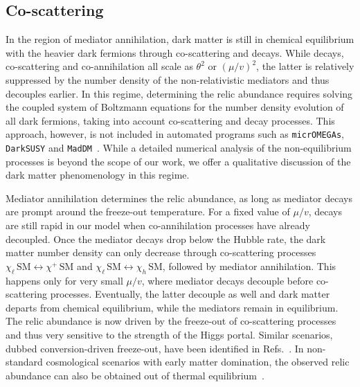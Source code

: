 \documentclass[nofootinbib,prd,aps,superscriptaddress,preprintnumbers]{revtex4}
\begin{document}
\subsection{Co-scattering}\noindent In the region of mediator annihilation, dark matter is still in chemical equilibrium with the heavier dark fermions through co-scattering and decays. While decays, co-scattering and co-annihilation all scale as $\theta^2$ or $(\mu/v)^2$, the latter is relatively suppressed by the number density of the non-relativistic mediators and thus decouples earlier. In this regime, determining the relic abundance requires solving the coupled system of Boltzmann equations for the number density evolution of all dark fermions, taking into account co-scattering and decay processes. This approach, however, is not included in automated programs such as \texttt{micrOMEGAs}, \texttt{DarkSUSY} and \texttt{MadDM}~\cite{Belanger:2018mqt,Bringmann:2018lay,Backovic}. While a detailed numerical analysis of the non-equilibrium processes is beyond the scope of our work, we offer a qualitative discussion of the dark matter phenomenology in this regime.

Mediator annihilation determines the relic abundance, as long as mediator decays are prompt around the freeze-out temperature. For a fixed value of $\mu/v$, decays are still rapid in our model when co-annihilation processes have already decoupled. Once the mediator decays drop below the Hubble rate, the dark matter number density can only decrease through co-scattering processes $\chi_\ell\,\text{SM} \leftrightarrow \chi^+\,\text{SM}$ and $\chi_\ell\,\text{SM} \leftrightarrow \chi_h\,\text{SM}$, followed by mediator annihilation. This happens only for very small $\mu/v$, where mediator decays decouple before co-scattering processes. Eventually, the latter decouple as well and dark matter departs from chemical equilibrium, while the mediators remain in equilibrium. The relic abundance is now driven by the freeze-out of co-scattering processes and thus very sensitive to the strength of the Higgs portal. Similar scenarios, dubbed conversion-driven freeze-out, have been identified in Refs.~\cite{DAgnolo:2017dbv,Garny:2017rxs}. In non-standard cosmological scenarios with early matter domination, the observed relic abundance can also be obtained out of thermal equilibrium~\cite{Drees:2018dsj}.\\
\end{document}
